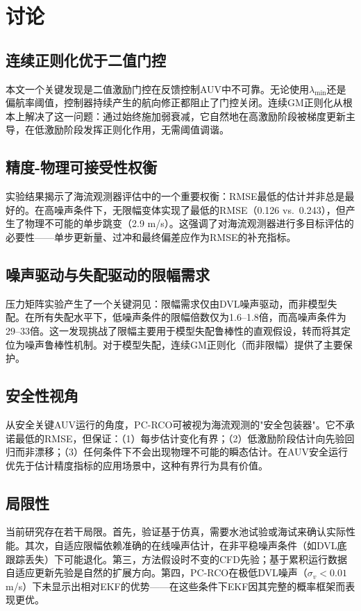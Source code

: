\section{讨论}

\subsection{连续正则化优于二值门控}

本文一个关键发现是二值激励门控在反馈控制AUV中不可靠。无论使用$\lambda_{\min}$还是偏航率阈值，控制器持续产生的航向修正都阻止了门控关闭。连续GM正则化从根本上解决了这一问题：通过始终施加弱衰减，它自然地在高激励阶段被梯度更新主导，在低激励阶段发挥正则化作用，无需阈值调谐。

\subsection{精度-物理可接受性权衡}

实验结果揭示了海流观测器评估中的一个重要权衡：RMSE最低的估计并非总是最好的。在高噪声条件下，无限幅变体实现了最低的RMSE（0.126 vs.\ 0.243），但产生了物理不可能的单步跳变（2.9 m/s）。这强调了对海流观测器进行多目标评估的必要性——单步更新量、过冲和最终偏差应作为RMSE的补充指标。

\subsection{噪声驱动与失配驱动的限幅需求}

压力矩阵实验产生了一个关键洞见：限幅需求仅由DVL噪声驱动，而非模型失配。在所有失配水平下，低噪声条件的限幅倍数仅为1.6--1.8倍，而高噪声条件为29--33倍。这一发现挑战了限幅主要用于模型失配鲁棒性的直观假设，转而将其定位为噪声鲁棒性机制。对于模型失配，连续GM正则化（而非限幅）提供了主要保护。

\subsection{安全性视角}

从安全关键AUV运行的角度，PC-RCO可被视为海流观测的"安全包装器"。它不承诺最低的RMSE，但保证：（1）每步估计变化有界；（2）低激励阶段估计向先验回归而非漂移；（3）任何条件下不会出现物理不可能的瞬态估计。在AUV安全运行优先于估计精度指标的应用场景中，这种有界行为具有价值。

\subsection{局限性}

当前研究存在若干局限。首先，验证基于仿真，需要水池试验或海试来确认实际性能。其次，自适应限幅依赖准确的在线噪声估计，在非平稳噪声条件（如DVL底跟踪丢失）下可能退化。第三，方法假设时不变的CFD先验；基于累积运行数据自适应更新先验是自然的扩展方向。第四，PC-RCO在极低DVL噪声（$\sigma_v < 0.01$ m/s）下未显示出相对EKF的优势——在这些条件下EKF因其完整的概率框架而表现更优。
